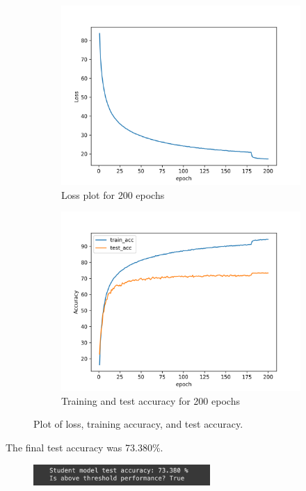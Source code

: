 \documentclass{article}
\begin{document}
\begin{figure}[h!]
\centering
\begin{subfigure}[b]{0.45\textwidth}
    \centering
    \includegraphics[width=\textwidth]{loss.png}
    \caption{Loss plot for 200 epochs}
\end{subfigure}
\begin{subfigure}[b]{0.45\textwidth}
    \centering
    \includegraphics[width=\textwidth]{acc.png}
    \caption{Training and test accuracy for 200 epochs}
\end{subfigure}
\caption{Plot of loss, training accuracy, and test accuracy.}
\label{fig:result}
\end{figure}



The final test accuracy was 73.380\%.

\begin{figure}[h!]
    \centering
    \includegraphics[width=0.6\textwidth]{fin_acc.png}
\end{figure}
\printbibliography
\end{document}
